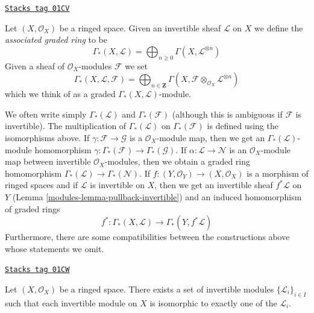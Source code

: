 \begin{definition}
\label{modules-definition-gamma-star}
\href{https://stacks.math.columbia.edu/tag/01CV}{\texttt{Stacks tag 01CV}}

Let $(X, \mathcal{O}_X)$ be a ringed space.
Given an invertible sheaf $\mathcal{L}$ on $X$ we define
the {\it associated graded ring} to be
$$
\Gamma_*(X, \mathcal{L})
=
\bigoplus\nolimits_{n \geq 0} \Gamma(X, \mathcal{L}^{\otimes n})
$$
Given a sheaf of $\mathcal{O}_X$-modules $\mathcal{F}$ we set
$$
\Gamma_*(X, \mathcal{L}, \mathcal{F})
=
\bigoplus\nolimits_{n \in \mathbf{Z}} \Gamma(X,
\mathcal{F} \otimes_{\mathcal{O}_X} \mathcal{L}^{\otimes n})
$$
which we think of as a graded $\Gamma_*(X, \mathcal{L})$-module.
\end{definition}

We often write simply $\Gamma_*(\mathcal{L})$ and $\Gamma_*(\mathcal{F})$
(although this is ambiguous if $\mathcal{F}$ is invertible).
The multiplication of $\Gamma_*(\mathcal{L})$ on
$\Gamma_*(\mathcal{F})$ is defined using the isomorphisms
above. If $\gamma : \mathcal{F} \to \mathcal{G}$ is a $\mathcal{O}_X$-module
map, then we get an $\Gamma_*(\mathcal{L})$-module homomorphism
$\gamma : \Gamma_*(\mathcal{F}) \to \Gamma_*(\mathcal{G})$.
If $\alpha : \mathcal{L} \to \mathcal{N}$ is an $\mathcal{O}_X$-module
map between invertible $\mathcal{O}_X$-modules, then we obtain
a graded ring homomorphism $\Gamma_*(\mathcal{L}) \to \Gamma_*(\mathcal{N})$.
If $f : (Y, \mathcal{O}_Y) \to (X, \mathcal{O}_X)$
is a morphism of ringed spaces and if $\mathcal{L}$ is invertible
on $X$, then we get an invertible sheaf $f^*\mathcal{L}$ on $Y$
(Lemma \ref{modules-lemma-pullback-invertible})
and an induced homomorphism of graded rings
$$
f^* :
\Gamma_*(X, \mathcal{L})
\longrightarrow
\Gamma_*(Y, f^*\mathcal{L})
$$
Furthermore, there are some compatibilities between the constructions
above whose statements we omit.

\begin{lemma}
\label{modules-lemma-pic-set}
\href{https://stacks.math.columbia.edu/tag/01CW}{\texttt{Stacks tag 01CW}}

Let $(X, \mathcal{O}_X)$ be a ringed space.
There exists a set of invertible modules $\{\mathcal{L}_i\}_{i \in I}$
such that each invertible module on $X$ is isomorphic to exactly
one of the $\mathcal{L}_i$.
\end{lemma}

